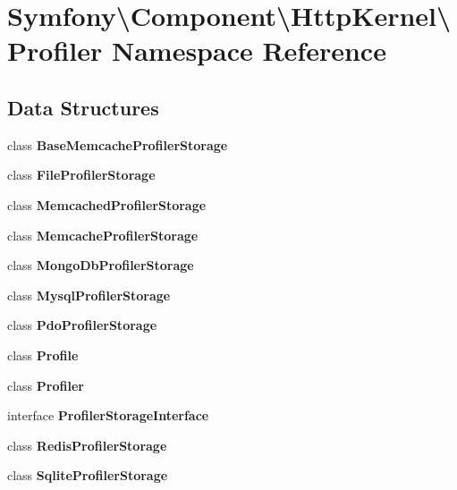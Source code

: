 \section{Symfony\textbackslash{}Component\textbackslash{}Http\+Kernel\textbackslash{}Profiler Namespace Reference}
\label{namespace_symfony_1_1_component_1_1_http_kernel_1_1_profiler}
\subsection*{Data Structures}
\begin{DoxyCompactItemize}
\item 
class {\bf Base\+Memcache\+Profiler\+Storage}
\item 
class {\bf File\+Profiler\+Storage}
\item 
class {\bf Memcached\+Profiler\+Storage}
\item 
class {\bf Memcache\+Profiler\+Storage}
\item 
class {\bf Mongo\+Db\+Profiler\+Storage}
\item 
class {\bf Mysql\+Profiler\+Storage}
\item 
class {\bf Pdo\+Profiler\+Storage}
\item 
class {\bf Profile}
\item 
class {\bf Profiler}
\item 
interface {\bf Profiler\+Storage\+Interface}
\item 
class {\bf Redis\+Profiler\+Storage}
\item 
class {\bf Sqlite\+Profiler\+Storage}
\end{DoxyCompactItemize}

